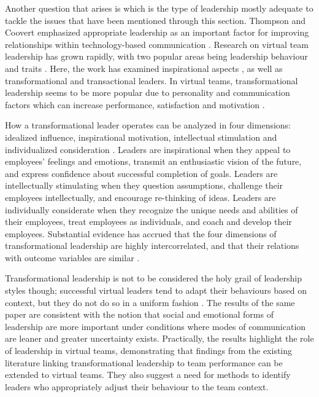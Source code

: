 Another question that arises is which is the type of leadership mostly adequate to tackle the issues that have been mentioned through this section.  Thompson and Coovert emphasized appropriate leadership as an important factor for improving relationships within technology-based communication \cite{Thompson2006}. Research on virtual team leadership has grown rapidly,  with two popular areas being leadership behaviour and traits \cite{Gilson2015}. Here, the work has examined inspirational aspects \cite{Joshi2009}, as well as transformational and transactional leaders. In virtual teams, transformational leadership seems to be more popular due to personality and communication factors \cite{Balthazard2009} which can increase performance, satisfaction and motivation \cite{Purvanova2009}.

How a transformational leader operates can be analyzed in four dimensions: idealized influence, inspirational motivation,  intellectual stimulation and individualized consideration \cite{Avolio2001}.  Leaders are inspirational when they appeal to employees' feelings and emotions, transmit an enthusiastic vision of the future, and express confidence about successful completion of goals. Leaders are intellectually stimulating when they question assumptions, challenge their employees intellectually, and encourage re-thinking of ideas. Leaders are individually considerate when they recognize the unique needs and abilities of their employees, treat employees as individuals, and coach and develop their employees. Substantial evidence has accrued that the four dimensions of transformational leadership are highly intercorrelated, and that their relations with outcome variables are similar \cite{Lowe1996}. 

Transformational leadership is not to be considered the holy grail of leadership styles though; successful virtual leaders tend to adapt their behaviours based on context, but they do not do so in a uniform fashion \cite{Purvanova2009}.  The results of the same paper are consistent with the notion that social and emotional forms of leadership are more important under conditions where modes of communication are leaner and greater uncertainty exists. Practically,  the results highlight the role of leadership in virtual teams, demonstrating that ﬁndings from the existing literature linking transformational leadership to team performance can be extended to virtual teams. They also suggest a need for methods to identify leaders who appropriately adjust their behaviour to the team context. 

